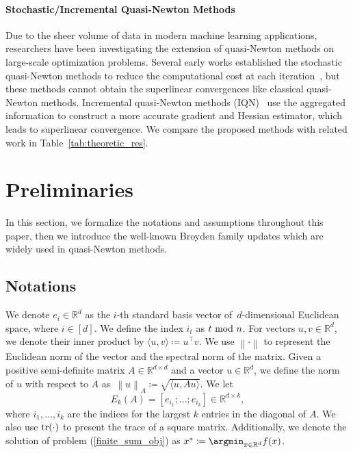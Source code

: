 \documentclass[letterpaper]{article} %
\theoremstyle{plain}
\theoremstyle{definition}
\theoremstyle{remark}
\newcommand\norm[1]{\left\lVert#1\right\rVert}
\def\BR{{\mathbb{R}}}
\begin{document}
\paragraph{Stochastic/Incremental Quasi-Newton Methods} Due to the sheer volume of data in modern machine learning applications, researchers have been investigating the extension of quasi-Newton methods on large-scale optimization problems.
Several early works established the stochastic quasi-Newton methods to reduce the computational cost at each iteration~\cite{byrd2016stochastic,mokhtari2014res,mokhtari2015global,moritz2016linearly,lucchi2015variance,chang2019accelerated}, but these methods cannot obtain the superlinear convergences like classical quasi-Newton methods. 
Incremental quasi-Newton methods (IQN)~\cite{mokhtari2018iqn,gao2020incremental,lahoti2023sharpened} use the aggregated information to construct a more accurate gradient and Hessian estimator, which leads to superlinear convergence. 
We compare the proposed methods with related work in Table~\ref{tab:theoretic_res}.

\section{Preliminaries}\label{sec:notations}
In this section, we formalize the notations and assumptions throughout this paper, then we introduce the well-known Broyden family updates which are widely used in quasi-Newton methods.

\subsection{Notations} 
We denote $e_i \in \BR^d$ as the $i$-th standard basis vector of~$d$-dimensional Euclidean space, where $i\in[d]$. 
We define the index $i_t$ as $t~{\rm mod}~n$. 
For vectors $u, v \in \BR^d$, we denote their inner product by $\langle u, v \rangle \coloneqq u^{\top} v$.
We use $\norm{\cdot}$ to represent the Euclidean norm of the vector and the spectral norm of the matrix. 
Given a positive semi-definite matrix $A\in\BR^{d\times d}$ and a vector $u\in\BR^d$, we define the norm of $u$ with respect to $A$ as~$\norm{u}_{A} \coloneqq \sqrt{\langle u, A u\rangle}$.
We let
\begin{equation}
    E_k(A) = [e_{i_1} ; \ldots; e_{i_k}] \in \BR^{d\times k},
    \label{largest_k_def}
\end{equation}
where $i_1, \ldots, i_k$ are the indices for the largest $k$ entries in the diagonal of $A$.
We also use ${\rm tr}(\cdot)$ to present the trace of a square matrix.
Additionally, we denote the solution of problem (\ref{finite_sum_obj}) as $x^*\coloneqq\argmin_{x\in\BR^d}f(x)$.
\end{document}
